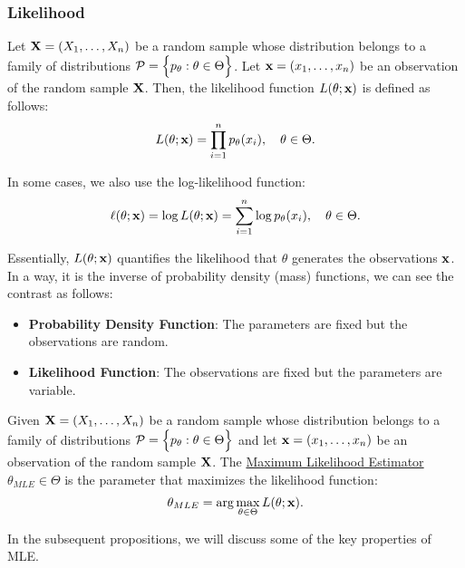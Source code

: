 \begin{proof*}
\subsubsection{Likelihood}
\begin{definition}
    Let ${\bf X}=(X_1, \dots, X_n)$ be a random sample whose distribution belongs to a family of distributions $\mathcal{P}=\Big\{ p_\theta:\theta\in\Theta \Big\}$. Let ${\bf x}=(x_1, \dots, x_n)$ be an observation of the random sample ${\bf X}$. Then, the likelihood function $L(\theta;{\bf x})$ is defined as follows:
    \begin{equation}
        L(\theta;{\bf x}) = \prod_{i=1}^n p_\theta(x_i), \quad \theta\in\Theta.
    \end{equation}

    \noindent In some cases, we also use the log-likelihood function:
    \begin{equation}
        \ell(\theta;{\bf x}) = \log L(\theta;{\bf x}) = \sum_{i=1}^n \log p_\theta(x_i), \quad \theta\in\Theta.
    \end{equation}

    \noindent Essentially, $L(\theta;{\bf x})$ quantifies the likelihood that $\theta$ generates the observations ${\bf x}$. In a way, it is the inverse of probability density (mass) functions, we can see the contrast as follows:
    \begin{itemize}
        \item \textbf{Probability Density Function}: The parameters are fixed but the observations are random.
        \item \textbf{Likelihood Function}: The observations are fixed but the parameters are variable.
    \end{itemize} 
\end{definition}

\begin{definition}
    Given ${\bf X}=(X_1, \dots, X_n)$ be a random sample whose distribution belongs to a family of distributions $\mathcal{P}=\Big\{ p_\theta:\theta\in\Theta \Big\}$ and let ${\bf x}=(x_1, \dots, x_n)$ be an observation of the random sample ${\bf X}$. The \underline{Maximum Likelihood Estimator} $\theta_{MLE}\in\Theta$ is the parameter that maximizes the likelihood function:
    \begin{equation}
        \theta_{MLE} = \arg\max_{\theta\in\Theta} L(\theta;{\bf x}).
    \end{equation}

    \noindent In the subsequent propositions, we will discuss some of the key properties of MLE.
\end{definition} 



\end{proof*}
